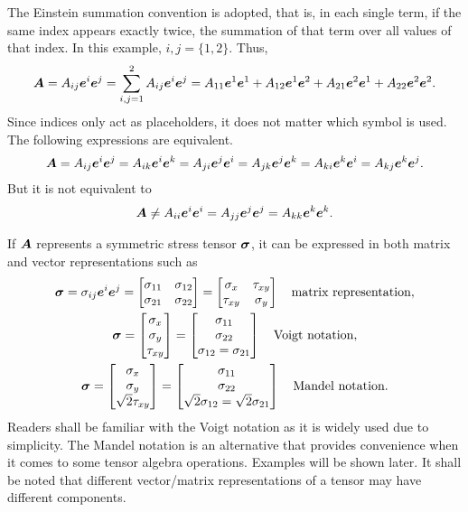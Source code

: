 The Einstein summation convention is adopted, that is, in each single term, if the same index appears exactly twice, the summation of that term over all values of that index. In this example, $i,j=\{1,2\}$. Thus,
\begin{gather}
\bm{A}=A_{ij}\bm{e}^i\bm{e}^j=\sum_{i,j=1}^{2}A_{ij}\bm{e}^i\bm{e}^j=A_{11}\bm{e}^1\bm{e}^1+A_{12}\bm{e}^1\bm{e}^2+A_{21}\bm{e}^2\bm{e}^1+A_{22}\bm{e}^2\bm{e}^2.
\end{gather}
Since indices only act as placeholders, it does not matter which symbol is used. The following expressions are equivalent.
\begin{gather}
\bm{A}=A_{ij}\bm{e}^i\bm{e}^j=A_{ik}\bm{e}^i\bm{e}^k=A_{ji}\bm{e}^j\bm{e}^i=A_{jk}\bm{e}^j\bm{e}^k=A_{ki}\bm{e}^k\bm{e}^i=A_{kj}\bm{e}^k\bm{e}^j.
\end{gather}
But it is not equivalent to
\begin{gather}
\bm{A}\neq{}A_{ii}\bm{e}^i\bm{e}^i=A_{jj}\bm{e}^j\bm{e}^j=A_{kk}\bm{e}^k\bm{e}^k.
\end{gather}

If $\bm{A}$ represents a symmetric stress tensor $\bm{\sigma}$, it can be expressed in both matrix and vector representations such as
\begin{gather}
\bm{\sigma}=\sigma_{ij}\bm{e}^i\bm{e}^j=\begin{bmatrix}
\sigma_{11}&\sigma_{12}\\
\sigma_{21}&\sigma_{22}
\end{bmatrix}=\begin{bmatrix}
\sigma_x&\tau_{xy}\\
\tau_{xy}&\sigma_y
\end{bmatrix}\quad\text{matrix representation},\\
\bm{\sigma}=\begin{bmatrix}
\sigma_x\\\sigma_y\\\tau_{xy}
\end{bmatrix}=\begin{bmatrix}
\sigma_{11}\\\sigma_{22}\\\sigma_{12}=\sigma_{21}
\end{bmatrix}\quad\text{Voigt notation},\\
\bm{\sigma}=\begin{bmatrix}
\sigma_x\\\sigma_y\\\sqrt{2}\tau_{xy}
\end{bmatrix}=\begin{bmatrix}
\sigma_{11}\\\sigma_{22}\\\sqrt{2}\sigma_{12}=\sqrt{2}\sigma_{21}
\end{bmatrix}\quad\text{Mandel notation}.
\end{gather}
Readers shall be familiar with the Voigt notation as it is widely used due to simplicity. The Mandel notation is an alternative that provides convenience when it comes to some tensor algebra operations. Examples will be shown later. It shall be noted that different vector/matrix representations of a tensor may have different components.

